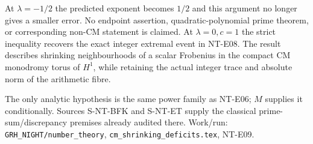 At $\lambda=-1/2$ the predicted exponent becomes $1/2$ and this
argument no longer gives a smaller error. No endpoint assertion,
quadratic-polynomial prime theorem, or corresponding non-CM
statement is claimed. At $\lambda=0,c=1$ the strict inequality
recovers the exact integer extremal event in NT-E08. The result
describes shrinking neighbourhoods of a scalar Frobenius in the
compact CM monodromy torus of $H^1$, while retaining the actual
integer trace and absolute norm of the arithmetic fibre.

The only analytic hypothesis is the same power family as NT-E06;
$M$ supplies it conditionally. Sources S-NT-BFK and S-NT-ET supply
the classical prime-sum/discrepancy premises already audited there.
Work/run: \texttt{GRH\_NIGHT/number\_theory},
\texttt{cm\_shrinking\_deficits.tex}, NT-E09.
